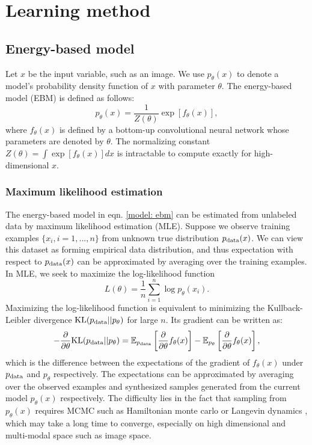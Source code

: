 \documentclass[10pt,twocolumn,letterpaper]{article}
\newcommand{\E}{\mathbb{E}}
\newcommand{\KL}{{\rm KL}}
\begin{document}
\section{Learning method}


\subsection{Energy-based model}
\label{sect: ebm}
Let $x$ be the input variable, such as an image. We use $p_\theta(x)$ to denote a model's probability density function of $x$ with parameter $\theta$. The energy-based model (EBM) is defined as follows:\begin{equation}
    p_\theta(x) = \frac{1}{Z(\theta)}\exp[f_\theta(x)],
    \label{model: ebm}
\end{equation}
where $f_\theta(x)$ is defined by a bottom-up convolutional neural network whose parameters are denoted by $\theta$. The normalizing constant $Z(\theta) = \int \exp[ f_\theta(x) ] dx$ is intractable to compute exactly for high-dimensional $x$.

\subsubsection{Maximum likelihood estimation}
The energy-based model in eqn. \ref{model: ebm} can be estimated from unlabeled data by maximum likelihood estimation (MLE). Suppose we observe training examples $\{x_i, i = 1,...,n\}$ from unknown true distribution $p_{\rm data}(x)$. We can view this dataset as forming empirical data distribution, and thus expectation with respect to $p_{\rm data}(x)$ can be approximated by averaging over the training examples. In MLE, we seek to maximize the log-likelihood function
\begin{equation}
L(\theta) = \frac{1}{n} \sum_{i=1}^n \log p_\theta(x_i).
\end{equation}
Maximizing the log-likelihood function is equivalent to minimizing the Kullback-Leibler divergence $\KL (p_{\rm data} || p_\theta)$ for large $n$. Its gradient can be written as:
\begin{equation}
- \frac{\partial}{\partial \theta} \KL(p_{\rm data}||p_\theta) = \E_{p_{\rm data}}\left[\frac{\partial}{\partial \theta} f_\theta(x)\right] - \E_{p_\theta}\left[\frac{\partial}{\partial \theta}f_\theta(x)\right],
\end{equation}
which is the difference between the expectations of the gradient of $f_\theta (x)$ under $p_{\rm data}$ and $p_\theta$ respectively. The expectations can be approximated by averaging over the observed examples and synthesized samples generated from the current model $p_\theta(x)$ respectively. The difficulty lies in the fact that sampling from $p_\theta(x)$ requires MCMC such as Hamiltonian monte carlo or Langevin dynamics \cite{girolami2011riemann, zhu1998grade}, which may take a long time to converge, especially on high dimensional and multi-modal space such as image space. 
\end{document}
